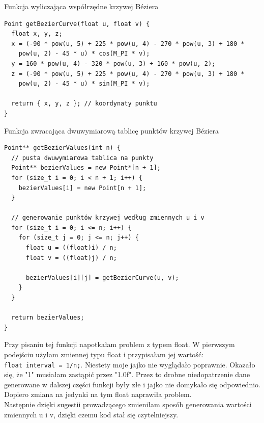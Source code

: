 \documentclass[12pt,a4paper,titlepage]{article}
\begin{document}
\begin{listing}[H]
\caption{Funkcja wyliczająca współrzędne krzywej Béziera}
\begin{verbatim}
Point getBezierCurve(float u, float v) {
  float x, y, z;
  x = (-90 * pow(u, 5) + 225 * pow(u, 4) - 270 * pow(u, 3) + 180 *
    pow(u, 2) - 45 * u) * cos(M_PI * v);
  y = 160 * pow(u, 4) - 320 * pow(u, 3) + 160 * pow(u, 2);
  z = (-90 * pow(u, 5) + 225 * pow(u, 4) - 270 * pow(u, 3) + 180 *
    pow(u, 2) - 45 * u) * sin(M_PI * v);

  return { x, y, z }; // koordynaty punktu
}
\end{verbatim}
\end{listing}

\begin{listing}[H]
\caption{Funkcja zwracająca dwuwymiarową tablicę punktów krzywej Béziera}
\begin{verbatim}
Point** getBezierValues(int n) {
  // pusta dwuwymiarowa tablica na punkty
  Point** bezierValues = new Point*[n + 1];
  for (size_t i = 0; i < n + 1; i++) {
    bezierValues[i] = new Point[n + 1];
  }
  
  // generowanie punktów krzywej według zmiennych u i v
  for (size_t i = 0; i <= n; i++) {
    for (size_t j = 0; j <= n; j++) {
      float u = ((float)i) / n;
      float v = ((float)j) / n;

      bezierValues[i][j] = getBezierCurve(u, v);
    }
  }

  return bezierValues;
}
\end{verbatim}
\end{listing}

Przy pisaniu tej funkcji napotkałam problem z typem float. W pierwszym podejściu użyłam zmiennej typu float i przypisałam jej wartość: \\ \texttt{float interval = 1/n;}. Niestety moje jajko nie wyglądało poprawnie. Okazało się, że "1" musiałam zastąpić przez "1.0f". Przez to drobne niedopatrzenie dane generowane w dalszej części funkcji były złe i jajko nie domykało się odpowiednio. Dopiero zmiana na jedynki na tym float naprawiła problem.\\
Następnie dzięki sugestii prowadzącego zmieniłam sposób generowania wartości zmiennych u i v, dzięki czemu kod stał się czytelniejszy.
\end{document}
